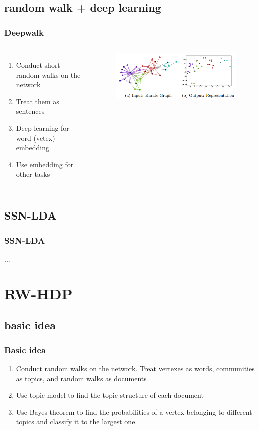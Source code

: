 \documentclass{beamer}
\begin{document}
\subsection{random walk + deep learning}
\begin{frame}
\frametitle{Deepwalk}
\begin{columns}[t] %
	
	\begin{enumerate}
		\item Conduct short random walks on the network
		\item Treat them as sentences
		\item Deep learning for word (vetex) embedding
		\item Use embedding for other tasks
	\end{enumerate}
	
	\begin{figure}
		\centering
		\includegraphics[scale=0.4]{deepwalk.png}
	\end{figure}
\end{columns}
\end{frame}

\subsection{SSN-LDA}
\begin{frame}
\frametitle{SSN-LDA}
...
\end{frame}


\section{RW-HDP}
\subsection{basic idea}
\begin{frame}
\frametitle{Basic idea}
\begin{enumerate}
	\item Conduct random walks on the network. Treat vertexes as words, communities as topics, and random walks as documents
	\item Use topic model to find the topic structure of each document
	\item Use Bayes theorem to find the probabilities of a vertex belonging to different topics and classify it to the largest one
\end{enumerate}
\end{frame}
\end{document}
